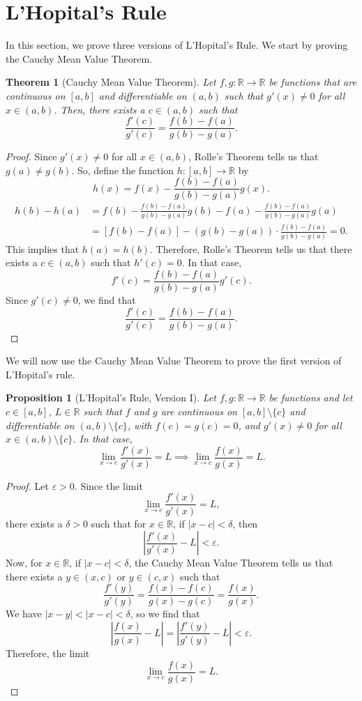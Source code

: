\documentclass[a4paper, openany]{memoir}
\theoremstyle{definition}
\theoremstyle{plain}
\newtheorem{theorem}[definition]{Theorem}
\newtheorem{proposition}[definition]{Proposition}
\begin{document}
\newpage

\section{L'Hopital's Rule}
In this section, we prove three versions of L'Hopital's Rule. We start by proving the Cauchy Mean Value Theorem.
\begin{theorem}[Cauchy Mean Value Theorem]
Let $f, g: \mathbb{R} \to \mathbb{R}$ be functions that are continuous on $[a, b]$ and differentiable on $(a, b)$ such that $g'(x) \neq 0$ for all $x \in (a, b)$. Then, there exists a $c \in (a, b)$ such that
\[\frac{f'(c)}{g'(c)} = \frac{f(b) - f(a)}{g(b) - g(a)}.\]
\end{theorem}
\begin{proof}
Since $g'(x) \neq 0$ for all $x \in (a, b)$, Rolle's Theorem tells us that $g(a) \neq g(b)$. So, define the function $h: [a, b] \to \mathbb{R}$ by
\[h(x) = f(x) - \frac{f(b) - f(a)}{g(b) - g(a)} g(x).\]
\begin{align*}
    h(b) - h(a) &= f(b) - \frac{f(b) - f(a)}{g(b) - g(a)} g(b) - f(a) - \frac{f(b) - f(a)}{g(b) - g(a)} g(a) \\
    &= [f(b) - f(a)] - (g(b) - g(a)) \cdot \frac{f(b) - f(a)}{g(b) - g(a)} = 0.
\end{align*}
This implies that $h(a) = h(b)$. Therefore, Rolle's Theorem tells us that there exists a $c \in (a, b)$ such that $h'(c) = 0$. In that case,
\[f'(c) = \frac{f(b) - f(a)}{g(b) - g(a)} g'(c).\]
Since $g'(c) \neq 0$, we find that
\[\frac{f'(c)}{g'(c)} = \frac{f(b) - f(a)}{g(b) - g(a)}.\]
\end{proof}
\noindent We will now use the Cauchy Mean Value Theorem to prove the first version of L'Hopital's rule.
\begin{proposition}[L'Hopital's Rule, Version I]
Let $f, g: \mathbb{R} \to \mathbb{R}$ be functions and let $c \in [a, b]$, $L \in \mathbb{R}$ such that $f$ and $g$ are continuous on $[a, b] \setminus \{c\}$ and differentiable on $(a, b) \setminus \{c\}$, with $f(c) = g(c) = 0$, and $g'(x) \neq 0$ for all $x \in (a, b) \setminus \{c\}$. In that case,
\[\lim_{x \to c} \frac{f'(x)}{g'(x)} = L \implies \lim_{x \to c} \frac{f(x)}{g(x)} = L.\]
\end{proposition}
\begin{proof}
Let $\varepsilon > 0$. Since the limit
\[\lim_{x \to c} \frac{f'(x)}{g'(x)} = L,\]
there exists a $\delta > 0$ such that for $x \in \mathbb{R}$, if $|x - c| < \delta$, then 
\[\left|\frac{f'(x)}{g'(x)} - L\right| < \varepsilon.\]
Now, for $x \in \mathbb{R}$, if $|x - c| < \delta$, the Cauchy Mean Value Theorem tells us that there exists a $y \in (x, c)$ or $y \in (c, x)$ such that
\[\frac{f'(y)}{g'(y)} = \frac{f(x) - f(c)}{g(x) - g(c)} = \frac{f(x)}{g(x)}.\]
We have $|x - y| < |x - c| < \delta$, so we find that
\[\left|\frac{f(x)}{g(x)} - L\right| = \left|\frac{f'(y)}{g'(y)} - L\right| < \varepsilon.\]
Therefore, the limit
\[\lim_{x \to c} \frac{f(x)}{g(x)} = L.\]
\end{proof}
\end{document}
